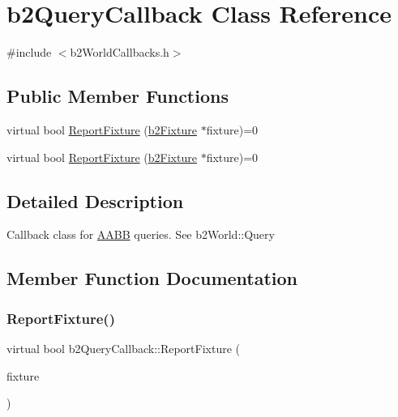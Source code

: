 \hypertarget{classb2QueryCallback}{}\section{b2\+Query\+Callback Class Reference}
\label{classb2QueryCallback}


{\ttfamily \#include $<$b2\+World\+Callbacks.\+h$>$}

\subsection*{Public Member Functions}
\begin{DoxyCompactItemize}
\item 
virtual bool \hyperlink{classb2QueryCallback_a187dd04dd0f5164fb05c2ce2cbfd9ee5}{Report\+Fixture} (\hyperlink{classb2Fixture}{b2\+Fixture} $\ast$fixture)=0
\item 
virtual bool \hyperlink{classb2QueryCallback_a187dd04dd0f5164fb05c2ce2cbfd9ee5}{Report\+Fixture} (\hyperlink{classb2Fixture}{b2\+Fixture} $\ast$fixture)=0
\end{DoxyCompactItemize}


\subsection{Detailed Description}
Callback class for \hyperlink{classAABB}{A\+A\+BB} queries. See b2\+World\+::\+Query 

\subsection{Member Function Documentation}
\mbox{\label{classb2QueryCallback_a187dd04dd0f5164fb05c2ce2cbfd9ee5}} 
\subsubsection{\texorpdfstring{Report\+Fixture()}{ReportFixture()}\hspace{0.1cm}{\footnotesize\ttfamily [1/2]}}
{\footnotesize\ttfamily virtual bool b2\+Query\+Callback\+::\+Report\+Fixture (\begin{DoxyParamCaption}\item[{\hyperlink{classb2Fixture}{b2\+Fixture} $\ast$}]{fixture }\end{DoxyParamCaption})\hspace{0.3cm}{\ttfamily [pure virtual]}}

